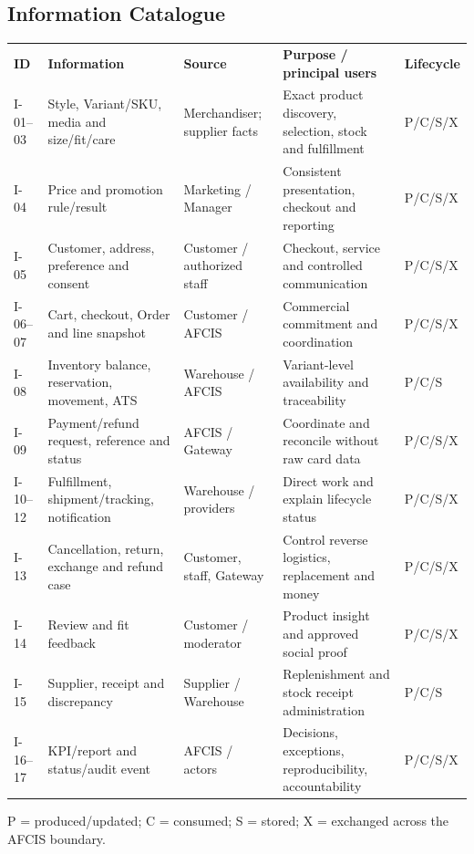 \documentclass[10pt,a4paper]{article}
\begin{document}
\subsection{Information Catalogue}
\begin{tabularx}{\textwidth}{L{9mm}L{35mm}L{29mm}Y L{20mm}}
\textbf{ID} & \textbf{Information} & \textbf{Source} & \textbf{Purpose / principal users} & \textbf{Lifecycle}\\
I-01--03 & Style, Variant/SKU, media and size/fit/care & Merchandiser; supplier facts & Exact product discovery, selection, stock and fulfillment & P/C/S/X\\
I-04 & Price and promotion rule/result & Marketing / Manager & Consistent presentation, checkout and reporting & P/C/S/X\\
I-05 & Customer, address, preference and consent & Customer / authorized staff & Checkout, service and controlled communication & P/C/S/X\\
I-06--07 & Cart, checkout, Order and line snapshot & Customer / AFCIS & Commercial commitment and coordination & P/C/S/X\\
I-08 & Inventory balance, reservation, movement, ATS & Warehouse / AFCIS & Variant-level availability and traceability & P/C/S\\
I-09 & Payment/refund request, reference and status & AFCIS / Gateway & Coordinate and reconcile without raw card data & P/C/S/X\\
I-10--12 & Fulfillment, shipment/tracking, notification & Warehouse / providers & Direct work and explain lifecycle status & P/C/S/X\\
I-13 & Cancellation, return, exchange and refund case & Customer, staff, Gateway & Control reverse logistics, replacement and money & P/C/S/X\\
I-14 & Review and fit feedback & Customer / moderator & Product insight and approved social proof & P/C/S/X\\
I-15 & Supplier, receipt and discrepancy & Supplier / Warehouse & Replenishment and stock receipt administration & P/C/S\\
I-16--17 & KPI/report and status/audit event & AFCIS / actors & Decisions, exceptions, reproducibility, accountability & P/C/S/X\\
\end{tabularx}
\footnotesize P = produced/updated; C = consumed; S = stored; X = exchanged across the AFCIS boundary.
\end{document}
